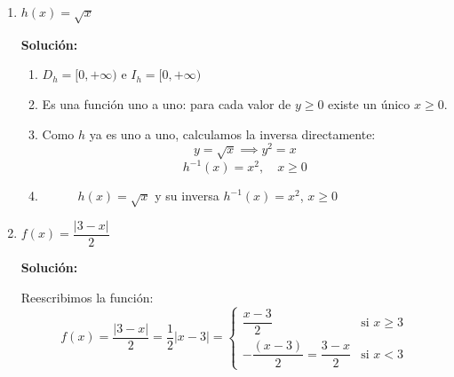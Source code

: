 \documentclass[12pt]{article}
\begin{document}
\begin{enumerate}[label=\alph*.-]
\newpage

\item $h(x) = \sqrt{x}$

\textbf{Solución:}

\begin{enumerate}[label=\roman*.]
    \item $D_h = [0, +\infty)$ \quad e \quad $I_h = [0, +\infty)$

    \item Es una función uno a uno: para cada valor de $y \geq 0$ existe un único $x \geq 0$.

    \item Como $h$ ya es uno a uno, calculamos la inversa directamente:
    \[
    y = \sqrt{x} \implies y^2 = x
    \]
    \[
    \boxed{h^{-1}(x) = x^2, \quad x \geq 0}
    \]

    \item
    \begin{figure}[H]
        \centering
        \caption{$h(x) = \sqrt{x}$ y su inversa $h^{-1}(x) = x^2$, $x \geq 0$}
    \end{figure}
\end{enumerate}

\newpage

\item $f(x) = \dfrac{|3 - x|}{2}$

\textbf{Solución:}

Reescribimos la función:
\[
f(x) = \frac{|3-x|}{2} = \frac{1}{2}|x - 3| =
\begin{cases}
    \dfrac{x - 3}{2} & \text{si } x \geq 3 \\[0.5em]
    -\dfrac{(x-3)}{2} = \dfrac{3-x}{2} & \text{si } x < 3
\end{cases}
\]


\end{enumerate}
\end{document}
